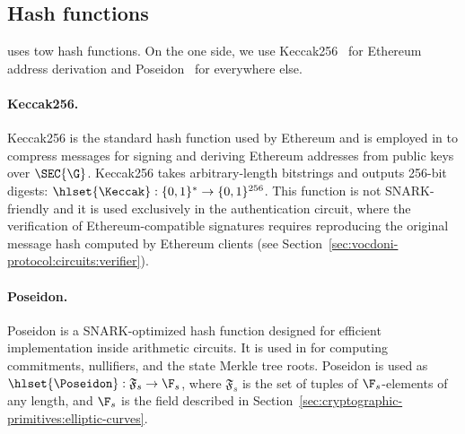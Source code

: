 \subsection{Hash functions}
\label{sec:cryptographic-primitives:hash}

\Davinci uses tow hash functions. On the one side, we use Keccak256~\cite{bertoni2011keccak} for Ethereum address derivation and Poseidon~\cite{grassi2021poseidon} for everywhere else. 

\paragraph{Keccak256.} Keccak256 is the standard hash function used by Ethereum and is employed in \davinci to compress messages for signing and deriving Ethereum addresses from public keys over $\SEC{\G}$. Keccak256 takes arbitrary-length bitstrings and outputs 256-bit digests: $\hlset{\Keccak} : \{0,1\}^* \rightarrow \{0,1\}^{256}$. This function is not SNARK-friendly and it is used exclusively in the authentication circuit, where the verification of Ethereum-compatible signatures requires reproducing the original message hash computed by Ethereum clients (see Section~\ref{sec:vocdoni-protocol:circuits:verifier}).

\paragraph{Poseidon.} Poseidon is a SNARK-optimized hash function designed for efficient implementation inside arithmetic circuits. It is used in \davinci for computing commitments, nullifiers, and the state Merkle tree roots. Poseidon is used as $\hlset{\Poseidon} : \mathfrak{F}_s \rightarrow \F_s$, where $\mathfrak{F}_s$ is the set of tuples of $\F_s$-elements of any length, and $\F_s$ is the field described in Section~\ref{sec:cryptographic-primitives:elliptic-curves}.


